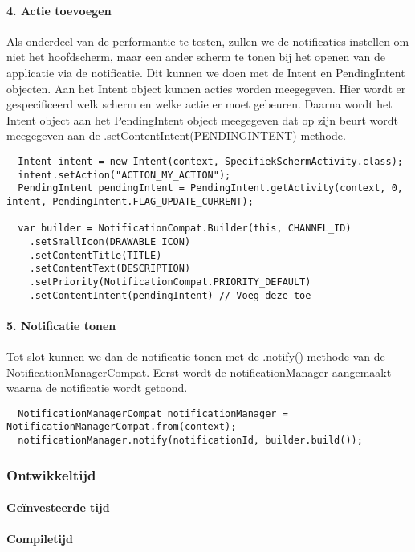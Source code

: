 \paragraph{4. Actie toevoegen}
Als onderdeel van de performantie te testen, zullen we de notificaties instellen om niet het hoofdscherm, 
maar een ander scherm te tonen bij het openen van de applicatie via de notificatie. Dit kunnen we doen met 
de Intent en PendingIntent objecten. Aan het Intent object kunnen acties worden meegegeven. Hier wordt er 
gespecificeerd welk scherm en welke actie er moet gebeuren. Daarna wordt het Intent object aan het PendingIntent 
object meegegeven dat op zijn beurt wordt meegegeven aan de .setContentIntent(PENDINGINTENT) methode.
\begin{verbatim}
  Intent intent = new Intent(context, SpecifiekSchermActivity.class);
  intent.setAction("ACTION_MY_ACTION");
  PendingIntent pendingIntent = PendingIntent.getActivity(context, 0, intent, PendingIntent.FLAG_UPDATE_CURRENT);

  var builder = NotificationCompat.Builder(this, CHANNEL_ID)
    .setSmallIcon(DRAWABLE_ICON)
    .setContentTitle(TITLE)
    .setContentText(DESCRIPTION)
    .setPriority(NotificationCompat.PRIORITY_DEFAULT)
    .setContentIntent(pendingIntent) // Voeg deze toe
\end{verbatim}

\paragraph{5. Notificatie tonen}
Tot slot kunnen we dan de notificatie tonen met de .notify() methode van de NotificationManagerCompat. 
Eerst wordt de notificationManager aangemaakt waarna de notificatie wordt getoond.
\begin{verbatim}
  NotificationManagerCompat notificationManager = NotificationManagerCompat.from(context);
  notificationManager.notify(notificationId, builder.build());
\end{verbatim}

\subsubsection{Ontwikkeltijd}

\paragraph{Geïnvesteerde tijd}

\paragraph{Compiletijd}

